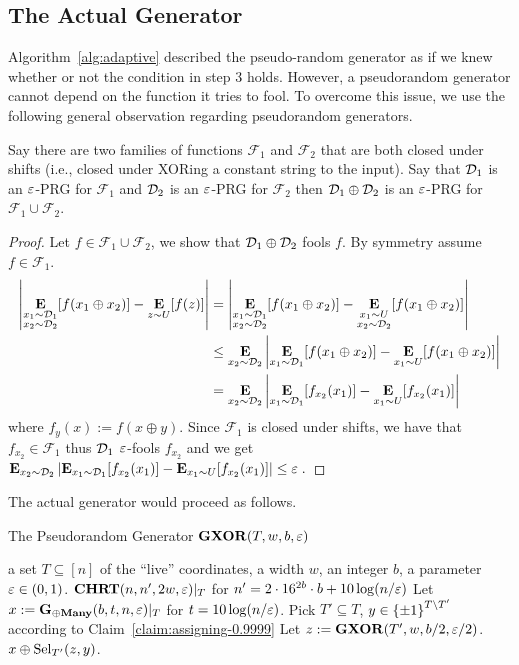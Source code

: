 \subsection{The Actual Generator}\label{sec:4.3}
Algorithm~\ref{alg:adaptive} described the pseudo-random generator as if we knew whether or not the condition in step 3 holds. 
However, a pseudorandom generator cannot depend on the function it tries to fool.
To overcome this issue, we use the following general observation regarding pseudorandom generators.

\begin{claim}\label{claim:XOR-of-PRGs}
Say there are two families of functions $\mathcal{F}_1$ and $\mathcal{F}_2$ that are both closed under shifts (i.e., closed under XORing a constant string to the input). Say that ${\mathcal{D}}_1$ is an $\varepsilon$-PRG for $\mathcal{F}_1$ and ${\mathcal{D}}_2$ is an $\varepsilon$-PRG for $\mathcal{F}_2$  then ${\mathcal{D}}_1 \oplus {\mathcal{D}}_2$ is an $\varepsilon$-PRG for $\mathcal{F}_1 \cup \mathcal{F}_2$.\end{claim}
\begin{proof}
%
Let $f \in \mathcal{F}_1 \cup \mathcal{F}_2$, we show that ${\mathcal{D}}_1 \oplus {\mathcal{D}}_2$ fools $f$.
By symmetry assume $f\in \mathcal{F}_1$.
\begin{align*}
\left|\mathop{\bf E\/}_{\substack{x_1\sim {\mathcal{D}}_1\\ x_2 \sim {\mathcal{D}}_2}}[f(x_1 \oplus x_2)] -\mathop{\bf E\/}_{\substack{z\sim U}}[f(z)]\right|
&=\left|\mathop{\bf E\/}_{\substack{x_1\sim {\mathcal{D}}_1\\ x_2 \sim {\mathcal{D}}_2}}[f(x_1 \oplus x_2)] -\mathop{\bf E\/}_{\substack{x_1\sim U\\ x_2 \sim {\mathcal{D}}_2}}[f(x_1 \oplus x_2)]\right|\\ 
&\le  \mathop{\bf E\/}_{x_2 \sim {\mathcal{D}}_2} 
\left|\mathop{\bf E\/}_{x_1 \sim {\mathcal{D}}_1}[f(x_1 \oplus x_2)] -\mathop{\bf E\/}_{x_1\sim U}[f(x_1 \oplus x_2)]\right|\\
&=  \mathop{\bf E\/}_{x_2 \sim {\mathcal{D}}_2} \left|\mathop{\bf E\/}_{x_1 \sim {\mathcal{D}}_1}[f_{x_2}(x_1)] -\mathop{\bf E\/}_{x_1\sim U}[f_{x_2}(x_1)]\right|\end{align*}
where $f_{y}(x):= f(x\oplus y)$. Since $\mathcal{F}_1$ is closed under shifts, we have that $f_{x_2} \in \mathcal{F}_1$ thus ${\mathcal{D}}_1$ $\varepsilon$-fools $f_{x_2}$ and we get
$
\mathop{\bf E\/}_{x_2 \sim {\mathcal{D}}_2} \left|\mathop{\bf E\/}_{x_1 \sim {\mathcal{D}}_1}[f_{x_2}(x_1)] -\mathop{\bf E\/}_{x_1\sim U}[f_{x_2}(x_1)]\right| \le \varepsilon\;.$
\end{proof}

The actual generator would proceed as follows.
\begin{algorithm}[H]
\caption{The Pseudorandom Generator $\mathbf{GXOR}(T, w, b,\varepsilon)$} %
\begin{algorithmic}[1]
\Require a set $T\subseteq [n]$ of the ``live'' coordinates, a width $w$,  an integer $b$, a parameter $\varepsilon\in (0,1)$.
 \Return $\mathbf{CHRT}(n, n', 2w,  \varepsilon)|_{T}$ for $n' = 2\cdot 16^{2b}\cdot b +10\log(n/\varepsilon)$
\EndIf
\State Let $x := \mathbf{G_{\oplus Many}}(b,t,n,\varepsilon)|_{T}$ for $t = 10 \log(n/\varepsilon)$.
\State Pick $T' \subseteq T$, $y\in {\{\pm1\}}^{T\setminus T'}$ according to Claim~\ref{claim:assigning-0.9999}
\State Let $z  := \mathbf{GXOR}(T', w, b/2,\varepsilon/2)$.
\State \Return  $x \oplus \mathrm{Sel}_{T'}(z,y)$.
\end{algorithmic}
\end{algorithm}


